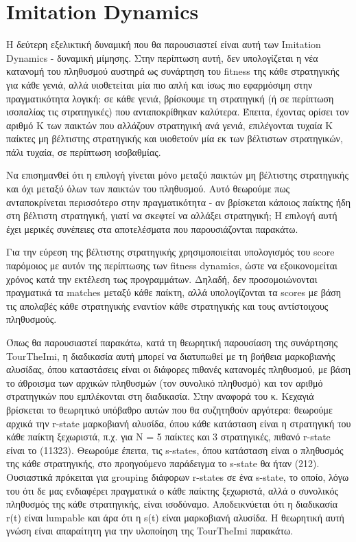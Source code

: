 \documentclass[12pt]{article}
\begin{document}
\section{Imitation Dynamics}
Η δεύτερη εξελικτική δυναμική που θα παρουσιαστεί είναι αυτή των Imitation Dynamics - δυναμική μίμησης. Στην περίπτωση αυτή, δεν υπολογίζεται η νέα κατανομή του πληθυσμού αυστηρά ως συνάρτηση του fitness της κάθε στρατηγικής για κάθε γενιά, αλλά υιοθετείται μία πιο απλή και ίσως πιο εφαρμόσιμη στην πραγματικότητα λογική: σε κάθε γενιά, βρίσκουμε τη στρατηγική (ή σε περίπτωση ισοπαλίας τις στρατηγικές) που ανταποκρίθηκαν καλύτερα. Έπειτα, έχοντας ορίσει τον αριθμό K των παικτών που αλλάζουν στρατηγική ανά γενιά, επιλέγονται τυχαία K παίκτες μη βέλτιστης στρατηγικής και υιοθετούν μία εκ των βέλτιστων στρατηγικών, πάλι τυχαία, σε περίπτωση ισοβαθμίας. 

Να επισημανθεί ότι η επιλογή γίνεται μόνο μεταξύ παικτών μη βέλτιστης στρατηγικής και όχι μεταξύ όλων των παικτών του πληθυσμού. Αυτό θεωρούμε πως ανταποκρίνεται περισσότερο στην πραγματικότητα - αν βρίσκεται κάποιος παίκτης ήδη στη βέλτιστη στρατηγική, γιατί να σκεφτεί να αλλάξει στρατηγική; Η επιλογή αυτή έχει μερικές συνέπειες στα αποτελέσματα που παρουσιάζονται παρακάτω.

Για την εύρεση της βέλτιστης στρατηγικής χρησιμοποιείται υπολογισμός του score παρόμοιος με αυτόν της περίπτωσης των fitness dynamics, ώστε να εξοικονομείται χρόνος κατά την εκτέλεση τως προγραμμάτων. Δηλαδή, δεν προσομοιώνονται πραγματικά τα matches μεταξύ κάθε παίκτη, αλλά υπολογίζονται τα scores με βάση τις απολαβές κάθε στρατηγικής εναντίον κάθε στρατηγικής και τους αντίστοιχους πληθυσμούς.

Όπως θα παρουσιαστεί παρακάτω, κατά τη θεωρητική παρουσίαση της συνάρτησης TourTheImi, η διαδικασία αυτή μπορεί να διατυπωθεί με τη βοήθεια μαρκοβιανής αλυσίδας, όπου καταστάσεις είναι οι διάφορες πιθανές κατανομές πληθυσμού, με βάση το άθροισμα των αρχικών πληθυσμών (τον συνολικό πληθυσμό) και τον αριθμό στρατηγικών που εμπλέκονται στη διαδικασία. Στην αναφορά του κ. Κεχαγιά βρίσκεται το θεωρητικό υπόβαθρο αυτών που θα συζητηθούν αργότερα: θεωρούμε αρχικά την r-state μαρκοβιανή αλυσίδα, όπου κάθε κατάσταση είναι η στρατηγική του κάθε παίκτη ξεχωριστά, π.χ. για N = 5 παίκτες και 3 στρατηγικές, πιθανό r-state είναι το (11323). Θεωρούμε έπειτα, τις s-states, όπου κατάσταση είναι ο πληθυσμός της κάθε στρατηγικής, στο προηγούμενο παράδειγμα το s-state θα ήταν (212). Ουσιαστικά πρόκειται για grouping διάφορων r-states σε ένα s-state, το οποίο, λόγω του ότι δε μας ενδιαφέρει πραγματικά ο κάθε παίκτης ξεχωριστά, αλλά ο συνολικός πληθυσμός της κάθε στρατηγικής, είναι ισοδύναμο. Αποδεικνύεται ότι η διαδικασία r(t) είναι lumpable και άρα ότι η s(t) είναι μαρκοβιανή αλυσίδα. Η θεωρητική αυτή γνώση είναι απαραίτητη για την υλοποίηση της TourTheImi παρακάτω.
\end{document}
